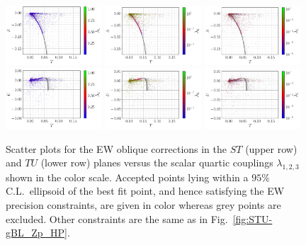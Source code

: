 \documentclass[10pt]{report}
\begin{document}
\begin{figure}[!htb]
\centering
\includegraphics[width=0.32\textwidth]{Images/BLSM_2/TS_L1_EW.pdf}
\includegraphics[width=0.32\textwidth]{Images/BLSM_2/TS_L2_EW.pdf}
\includegraphics[width=0.32\textwidth]{Images/BLSM_2/TS_L3_EW.pdf}
\includegraphics[width=0.32\textwidth]{Images/BLSM_2/TU_L1_EW.pdf}
\includegraphics[width=0.32\textwidth]{Images/BLSM_2/TU_L2_EW.pdf}
\includegraphics[width=0.32\textwidth]{Images/BLSM_2/TU_L3_EW.pdf}
\caption{Scatter plots for the EW oblique corrections in the $ST$ (upper row) and $TU$ (lower row) planes versus the scalar quartic couplings $\lambda_{1,2,3}$ shown in the color scale.
Accepted points lying within a $95\%$ C.L.~ellipsoid of the best fit point, and hence satisfying the EW precision constraints, are given in color whereas grey points are excluded. Other constraints are the same as in Fig.~\ref{fig:STU-gBL_Zp_HP}.  }
\label{fig:STU-lambda-excl}
\end{figure}	
\end{document}
